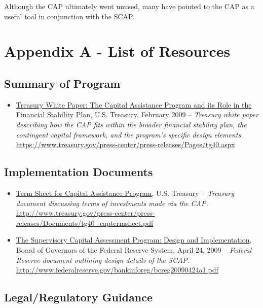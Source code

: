 \documentclass[12pt]{article}
\begin{document}
Although the CAP ultimately went unused, many have pointed to the CAP as a useful tool in conjunction with the SCAP.

\newpage
{}


\nocite{*}


\section{Appendix A - List of Resources}

\subsection{Summary of Program}

\begin{itemize}

\item
\ul{Treasury White Paper: The Capital Assistance Program and its Role in the Financial Stability Plan}, U.S. Treasury, February 2009 -- \emph{Treasury white paper describing how the CAP fits within the broader financial stability plan, the contingent capital framework, and the program's specific design elements.} \url{https://www.treasury.gov/press-center/press-releases/Pages/tg40.aspx}
\end{itemize}

\subsection{Implementation Documents}
\begin{itemize}
\item
\ul{Term
 Sheet for Capital Assistance Program}, U.S. Treasury -- \emph{Treasury
 document discussing terms of investments made via the CAP.} \url{http://www.treasury.gov/press-center/press-releases/Documents/tg40_captermsheet.pdf}
\item
\ul{The
 Supervisory Capital Assessment Program: Design and Implementation},
 Board of Governors of the Federal Reserve System, April 24, 2009 -- \emph{Federal Reserve document outlining design details of the SCAP.} \url{http://www.federalreserve.gov/bankinforeg/bcreg20090424a1.pdf}
\end{itemize}

\subsection{Legal/Regulatory Guidance}
\end{document}
